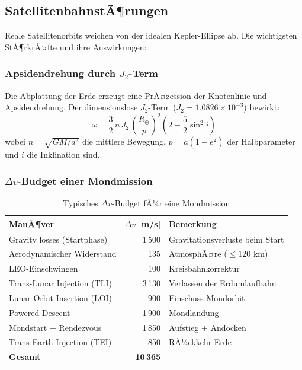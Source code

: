 ﻿\documentclass[12pt,a4paper]{article}
\newcommand{\Dv}{\Delta v}
\begin{document}
\subsection{SatellitenbahnstÃ¶rungen}

Reale Satellitenorbits weichen von der idealen Kepler-Ellipse ab. Die wichtigsten
StÃ¶rkrÃ¤fte und ihre Auswirkungen:

\subsubsection{Apsidendrehung durch $J_2$-Term}

Die Abplattung der Erde erzeugt eine PrÃ¤zession der Knotenlinie und Apsidendrehung.
Der dimensionslose $J_2$-Term ($J_2 = 1.0826 \times 10^{-3}$) bewirkt:
\[
  \dot{\omega} = \frac{3}{2}\,n\,J_2\,\left(\frac{R_\oplus}{p}\right)^2
    \left(2 - \frac{5}{2}\sin^2 i\right)
\]
wobei $n = \sqrt{GM/a^3}$ die mittlere Bewegung, $p = a(1-e^2)$ der Halbparameter
und $i$ die Inklination sind.

\subsubsection{$\Delta v$-Budget einer Mondmission}

\begin{table}[H]
\centering
\caption{Typisches $\Dv$-Budget fÃ¼r eine Mondmission}
\label{tab:dv_mond}
\begin{tabular}{lrl}
\toprule
\textbf{ManÃ¶ver} & \textbf{$\Dv$ [m/s]} & \textbf{Bemerkung}\\
\midrule
Gravity losses (Startphase)       & 1\,500 & Gravitationsverluste beim Start\\
Aerodynamischer Widerstand        &   135  & AtmosphÃ¤re ($\leq 120$ km)\\
LEO-Einschwingen                  &   100  & Kreisbahnkorrektur\\
Trans-Lunar Injection (TLI)       & 3\,130 & Verlassen der Erdumlaufbahn\\
Lunar Orbit Insertion (LOI)       &   900  & Einschuss Mondorbit\\
Powered Descent                   & 1\,900 & Mondlandung\\
Mondstart + Rendezvous            & 1\,850 & Aufstieg + Andocken\\
Trans-Earth Injection (TEI)       &   850  & RÃ¼ckkehr Erde\\
\midrule
\textbf{Gesamt}                   & \textbf{10\,365} & \\
\bottomrule
\end{tabular}
\end{table}
\end{document}
